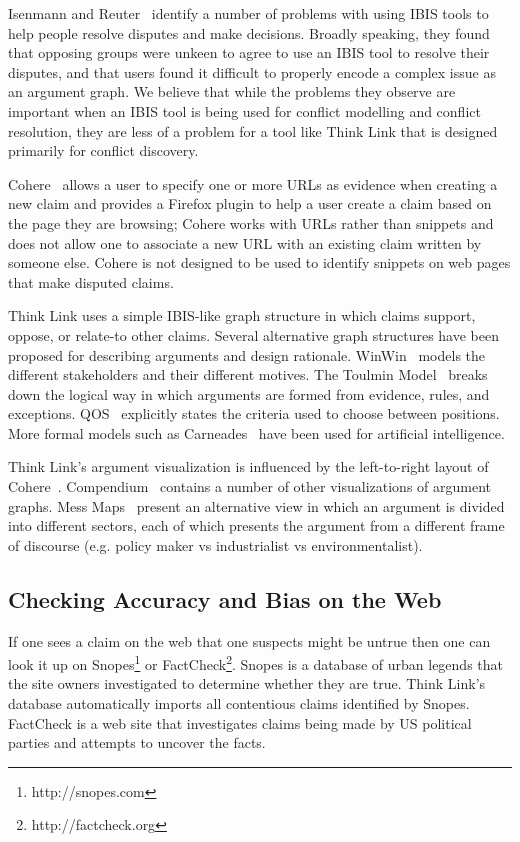 \documentclass{chi2009}
\begin{document}
Isenmann and Reuter~\cite{Isenmann1997} identify a number of problems with using IBIS tools to help people resolve disputes and make decisions. Broadly speaking, they found that opposing groups were unkeen to agree to use an IBIS tool to resolve their disputes, and that users found it difficult to properly encode a complex issue as an argument graph. We believe that while the problems they observe are important when an IBIS tool is being used for conflict modelling and conflict resolution, they are less of a problem for a tool like Think Link that is designed primarily for conflict discovery.

Cohere~\cite{Shum2008} allows a user to specify one or more URLs as evidence when creating a new claim and provides a Firefox plugin to help a user create a claim based on the page they are browsing; Cohere works with URLs rather than snippets and does not allow one to associate a new URL with an existing claim written by someone else. Cohere is not designed to be used to identify snippets on web pages that make disputed claims.

Think Link uses a simple IBIS-like graph structure in which claims support, oppose, or relate-to other claims. Several alternative graph structures have been proposed for describing arguments and design rationale. WinWin~\cite{Boehm2006} models the different stakeholders and their different motives. The Toulmin Model~\cite{toulmin1958} breaks down the logical way in which arguments are formed from evidence, rules, and exceptions. QOS~\cite{Maclean1991} explicitly states the criteria used to choose between positions. More formal models such as Carneades~\cite{Gordon2007} have been used for artificial intelligence.

Think Link's argument visualization is influenced by the left-to-right layout of Cohere~\cite{Shum2008}. Compendium~\cite{Selvin2001} contains a number of other visualizations of argument graphs. Mess Maps~\cite{Horn2007} present an alternative view in which an argument is divided into different sectors, each of which presents the argument from a different frame of discourse (e.g. policy maker vs industrialist vs environmentalist).



\subsection{Checking Accuracy and Bias on the Web}

If one sees a claim on the web that one suspects might be untrue then one can look it up on Snopes\footnote{http://snopes.com} or FactCheck\footnote{http://factcheck.org}. Snopes is a database of urban legends that the site owners investigated to determine whether they are true. 
Think Link's database automatically imports all contentious claims identified by Snopes.
FactCheck is a web site that investigates claims being made by US political parties and attempts to uncover the facts.  
\end{document}
